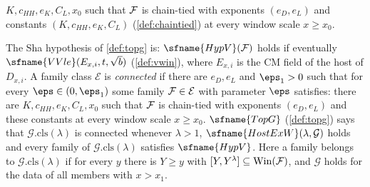 \begin{definition}[Links]
$K,c_{HH},e_K,C_L,x_0$ such that $\mathcal{F}$ is chain-tied with exponents $(e_D,e_L)$ and constants
$(K,c_{HH},e_K,C_L)$ (\cref{def:chaintied}) at every window scale $x\ge x_0$.
\end{definition}

The Sha hypothesis of \cref{def:topg} is: $\sfname{HypV}(\topshapeF)$ holds if eventually
$\sfname{VVle}(E_{x,i},t,\sqrt b)$ (\cref{def:vwin}), where $E_{x,i}$ is the CM field of the host of $D_{x,i}$.
A family class $\mathcal E$ is \emph{connected} if there are $e_D,e_L$ and $\eps_1>0$ such that for every
$\eps\in(0,\eps_1)$ some family $\mathcal{F}\in\mathcal E$ with parameter $\eps$ satisfies: there are
$K,c_{HH},e_K,C_L,x_0$ such that $\mathcal{F}$ is chain-tied with exponents $(e_D,e_L)$ and these constants at
every window scale $x\ge x_0$. $\sfname{TopG}$ (\cref{def:topg}) says that $\mathcal G.\mathrm{cls}(\lambda)$
is connected whenever $\lambda>1$, $\sfname{HostExW}(\lambda,\mathcal G)$ holds and every family of
$\mathcal G.\mathrm{cls}(\lambda)$ satisfies $\sfname{HypV}$. Here a family belongs to
$\mathcal G.\mathrm{cls}(\lambda)$ if for every $y$ there is $Y\ge y$ with $[Y,Y^\lambda]\subseteq
\mathrm{Win}(\mathcal{F})$, and $\mathcal G$ holds for the data of all members with $x>x_1$.

